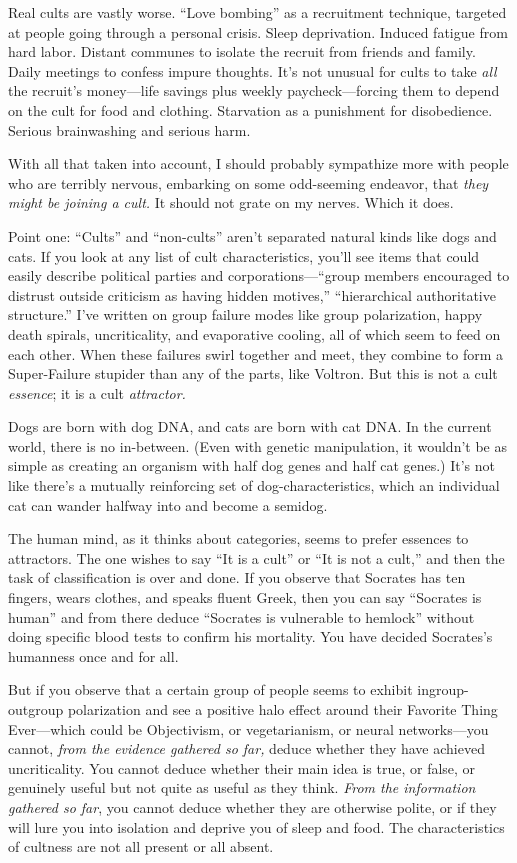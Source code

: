 {
 Real cults are vastly worse. ``Love
bombing'' as a recruitment technique, targeted at
people going through a personal crisis. Sleep deprivation. Induced
fatigue from hard labor. Distant communes to isolate the recruit from
friends and family. Daily meetings to confess impure thoughts.
It's not unusual for cults to take \textit{all} the
recruit's money---life savings plus weekly
paycheck---forcing them to depend on the cult for food and clothing.
Starvation as a punishment for disobedience. Serious brainwashing and
serious harm.}

{
 With all that taken into account, I should probably sympathize
more with people who are terribly nervous, embarking on some
odd-seeming endeavor, that \textit{they might be joining a cult.} It
should not grate on my nerves. Which it does.}

{
 Point one: ``Cults'' and
``non-cults'' aren't
separated natural kinds like dogs and cats. If you look at any list of
cult characteristics, you'll see items that could
easily describe political parties and
corporations---``group members encouraged to distrust
outside criticism as having hidden motives,''
``hierarchical authoritative
structure.'' I've written on group
failure modes like group polarization, happy death spirals,
uncriticality, and evaporative cooling, all of which seem to feed on
each other. When these failures swirl together and meet, they combine
to form a Super-Failure stupider than any of the parts, like Voltron.
But this is not a cult \textit{essence}; it is a cult
\textit{attractor.}}

{
 Dogs are born with dog DNA, and cats are born with cat DNA. In the
current world, there is no in-between. (Even with genetic manipulation,
it wouldn't be as simple as creating an organism with
half dog genes and half cat genes.) It's not like
there's a mutually reinforcing set of
dog-characteristics, which an individual cat can wander halfway into
and become a semidog.}

{
 The human mind, as it thinks about categories, seems to prefer
essences to attractors. The one wishes to say ``It is
a cult'' or ``It is not a
cult,'' and then the task of classification is over
and done. If you observe that Socrates has ten fingers, wears clothes,
and speaks fluent Greek, then you can say ``Socrates
is human'' and from there deduce
``Socrates is vulnerable to
hemlock'' without doing specific blood tests to
confirm his mortality. You have decided Socrates's
humanness once and for all.}

{
 But if you observe that a certain group of people seems to exhibit
ingroup-outgroup polarization and see a positive halo effect around
their Favorite Thing Ever---which could be Objectivism, or
vegetarianism, or neural networks{}---you cannot, \textit{from the
evidence gathered so far,} deduce whether they have achieved
uncriticality. You cannot deduce whether their main idea is true, or
false, or genuinely useful but not quite as useful as they think.
\textit{From the information gathered so far}, you cannot deduce
whether they are otherwise polite, or if they will lure you into
isolation and deprive you of sleep and food. The characteristics of
cultness are not all present or all absent.}

